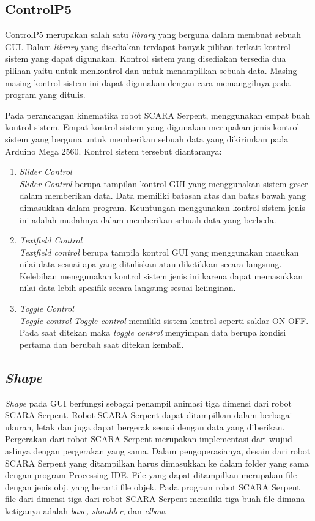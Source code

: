 \subsection{ControlP5}
ControlP5 merupakan salah satu \textit{library} yang berguna dalam membuat sebuah GUI. Dalam \textit{library} yang disediakan terdapat banyak pilihan terkait kontrol sistem yang dapat digunakan. Kontrol sistem yang disediakan tersedia dua pilihan yaitu untuk menkontrol dan untuk menampilkan sebuah data. Masing-masing kontrol sistem ini dapat digunakan dengan cara memanggilnya pada program yang ditulis.

Pada perancangan kinematika robot SCARA Serpent, menggunakan empat buah kontrol sistem. Empat kontrol sistem yang digunakan merupakan jenis kontrol sistem yang berguna untuk memberikan sebuah data yang dikirimkan pada Arduino Mega 2560. Kontrol sistem tersebut diantaranya:
\begin{enumerate}
	\item \textit{Slider Control} \\
	\textit{Slider Control} berupa tampilan kontrol GUI yang menggunakan sistem geser dalam memberikan data. Data memiliki batasan atas dan batas bawah yang dimasukkan dalam program. Keuntungan menggunakan kontrol sistem jenis ini adalah mudahnya dalam memberikan sebuah data yang berbeda.
	
	
	\item \textit{Textfield Control} \\
	\textit{Textfield control} berupa tampila kontrol GUI yang menggunakan masukan nilai data sesuai apa yang dituliskan atau diketikkan secara langsung. Kelebihan menggunakan kontrol sistem jenis ini karena dapat memasukkan nilai data lebih spesifik secara langsung sesuai keiinginan.
	
	
	\item \textit{Toggle Control} \\
	\textit{Toggle control}
	\textit{Toggle control} memiliki sistem kontrol seperti saklar ON-OFF. Pada saat ditekan maka \textit{toggle control} menyimpan data berupa kondisi pertama dan berubah saat ditekan kembali. 
	
\end{enumerate}
\subsection{\textit{Shape}}
\textit{Shape} pada GUI berfungsi sebagai penampil animasi tiga dimensi dari robot SCARA Serpent. Robot SCARA Serpent dapat ditampilkan dalam berbagai ukuran, letak dan juga dapat bergerak sesuai dengan data yang diberikan. Pergerakan dari robot SCARA Serpent merupakan implementasi dari wujud aslinya dengan pergerakan yang sama. Dalam pengoperasianya, desain dari robot SCARA Serpent yang ditampilkan harus dimasukkan ke dalam folder yang sama dengan program Processing IDE. File yang dapat ditampilkan merupakan file dengan jenis obj. yang berarti file objek. Pada program robot SCARA Serpent file dari dimensi tiga dari robot SCARA Serpent memiliki tiga buah file dimana ketiganya adalah \textit{base, shoulder}, dan \textit{elbow}. 

